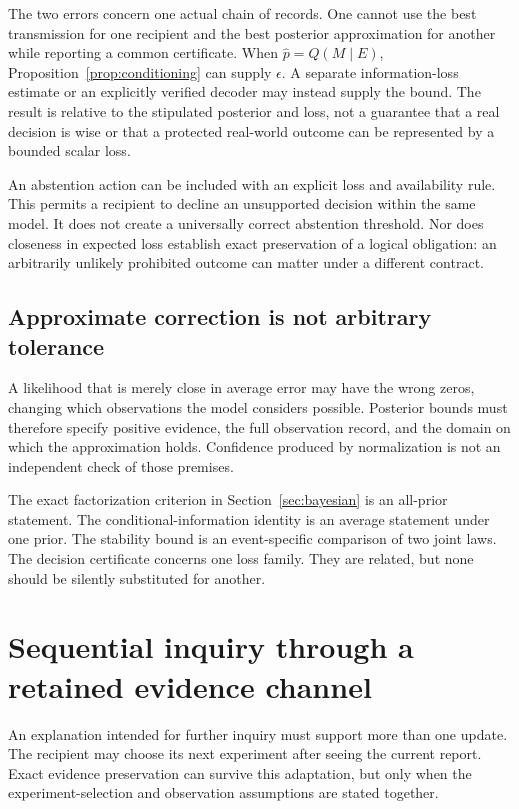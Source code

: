 \documentclass[11pt,letterpaper]{article}
\theoremstyle{plain}
\theoremstyle{definition}
\begin{document}
The two errors concern one actual chain of records. One cannot use the best transmission for one recipient and the best posterior approximation for another while reporting a common certificate. When $\widehat p=Q(M\mid E)$, Proposition~\ref{prop:conditioning} can supply $\epsilon$. A separate information-loss estimate or an explicitly verified decoder may instead supply the bound. The result is relative to the stipulated posterior and loss, not a guarantee that a real decision is wise or that a protected real-world outcome can be represented by a bounded scalar loss.

An abstention action can be included with an explicit loss and availability rule. This permits a recipient to decline an unsupported decision within the same model. It does not create a universally correct abstention threshold. Nor does closeness in expected loss establish exact preservation of a logical obligation: an arbitrarily unlikely prohibited outcome can matter under a different contract.

\subsection{Approximate correction is not arbitrary tolerance}
A likelihood that is merely close in average error may have the wrong zeros, changing which observations the model considers possible. Posterior bounds must therefore specify positive evidence, the full observation record, and the domain on which the approximation holds. Confidence produced by normalization is not an independent check of those premises.

The exact factorization criterion in Section~\ref{sec:bayesian} is an all-prior statement. The conditional-information identity is an average statement under one prior. The stability bound is an event-specific comparison of two joint laws. The decision certificate concerns one loss family. They are related, but none should be silently substituted for another.


\section{Sequential inquiry through a retained evidence channel}\label{sec:sequential}
An explanation intended for further inquiry must support more than one update. The recipient may choose its next experiment after seeing the current report. Exact evidence preservation can survive this adaptation, but only when the experiment-selection and observation assumptions are stated together.
\end{document}
